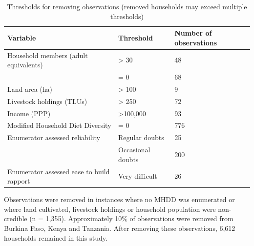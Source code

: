 \newpage


\begin{table}[H]
  \captionsetup{singlelinecheck = false, justification=justified}
  \caption{Thresholds for removing observations (removed households may exceed multiple thresholds)}
  \label{tab:C_3}
  \small
\begin{tabularx}{\textwidth}{@{}lYY@{}}
\toprule
Variable & Threshold & Number of observations \\
\midrule
Household members (adult equivalents) & {\textgreater} 30 & 48 \\
 & = 0 & 68 \\
Land area (ha) & {\textgreater} 100 & 9 \\
Livestock holdings (TLUs) & {\textgreater} 250 & 72 \\
Income (PPP) & {\textgreater}100,000 & 93 \\
Modified Household Diet Diversity & = 0 & 776 \\
Enumerator assessed reliability & Regular doubts & 25 \\
 & Occasional doubts & 200 \\
Enumerator assessed ease to build rapport & Very difficult & 26 \\
\bottomrule
\end{tabularx}
\end{table}


Observations were removed in instances where no MHDD was enumerated or where land cultivated, livestock holdings or household population were non-credible (n = 1,355). Approximately 10\% of observations were removed from Burkina Faso, Kenya and Tanzania. After removing these observations, 6,612 households remained in this study.


\newpage

